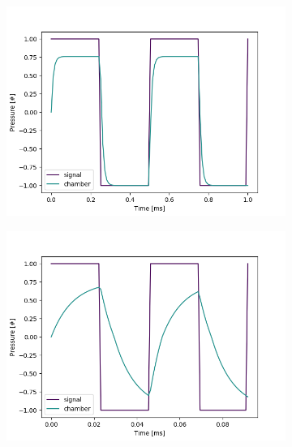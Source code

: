 \documentclass[fontsize=12pt, a4paper]{scrartcl}
\begin{document}
\begin{figure}[H]
    \centering
    \begin{subfigure}[H]{0.48\textwidth}
        \includegraphics[width=\textwidth, valign=t]{bilder/frequency/frequency_default_2kHz.png}
    \end{subfigure}
    \begin{subfigure}[H]{0.48\textwidth}
        \includegraphics[width=\textwidth, valign=t]{bilder/frequency/frequency_to_fast_21_8 khz.png}
    \end{subfigure}
    \begin{subfigure}[H]{0.48\textwidth}

\end{subfigure}
\end{figure}
\end{document}
